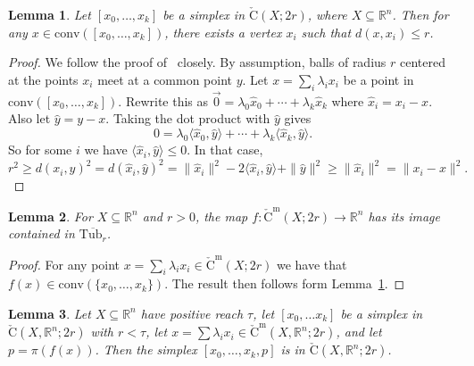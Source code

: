 \documentclass{amsart}
\theoremstyle{plain}
\newtheorem{lemma}{Lemma}[section]
\theoremstyle{definition}
\theoremstyle{myremark}
\newcommand{\R}{\mathbb{R}}
\newcommand{\conv}{\mathrm{conv}}
\newcommand{\cech}[2]{\mathrm{\check{C}}(#1;#2)}
\newcommand{\cecha}[3]{\mathrm{\check{C}}(#1,#2;#3)}
\newcommand{\cechm}[2]{\mathrm{\check{C}^m}(#1;#2)}
\newcommand{\cecham}[3]{\mathrm{\check{C}^m}(#1,#2;#3)}
\newcommand{\Tub}{\mathrm{Tub}}
\begin{document}
\begin{lemma}\label{lem:cech-radius}
Let $[x_0 , \ldots , x_k]$ be a simplex in $\cech{X}{2r}$, where $X\subseteq\R^n$.
Then for any $x \in \conv([x_0 , \ldots , x_k])$, there exists a vertex $x_i$ such that $d(x,x_i) \le r$.
\end{lemma}
\begin{proof}
We follow the proof of~\cite[Lemma~2.9]{DeSilvaGhrist} closely.
By assumption, balls of radius $r$ centered at the points $x_i$ meet at a common point $y$.
Let $x = \sum_i \lambda_i x_i$ be a point in $\conv([x_0 , \ldots , x_k])$.
Rewrite this as $\vec{0} = \lambda_0 \hat{x}_0 + \cdots + \lambda_k \hat{x}_k$ where $\hat{x}_i = x_i - x$.
Also let $\hat{y} = y - x$.
Taking the dot product with $\hat{y}$ gives
\[
   0 = \lambda_0\langle\hat{x}_0,\hat{y}\rangle + \cdots + \lambda_k\langle\hat{x}_k,\hat{y}\rangle.
\]
So for some $i$ we have $\langle\hat{x}_i,\hat{y}\rangle \le 0$.
In that case,
\[
r^2 \ge d(x_i,y)^2 = d(\hat{x}_i,\hat{y})^2 = \|\hat{x}_i\|^2 - 2\langle\hat{x}_i,\hat{y}\rangle + \|\hat{y}\|^2 \ge \|\hat{x}_i\|^2 = \|x_i - x\|^2.
\]
\end{proof}

\begin{lemma}\label{lem:cech-tub}
For $X\subseteq\R^n$ and $r>0$, the map $f\colon \cechm{X}{2r}\to\R^n$ has its image contained in $\overline{\Tub_r}$.
\end{lemma}

\begin{proof}
For any point $x=\sum_i\lambda_i x_i\in \cechm{X}{2r}$ we have that $f(x) \in \conv(\{x_0 , \ldots , x_k\})$.
The result then follows form Lemma~\ref{lem:cech-radius}.
\end{proof}

\begin{lemma}\label{lem:cech-simplex-ambient}
Let $X\subseteq\R^n$ have positive reach $\tau$, let $[x_0, \ldots x_k]$ be a simplex in $\cecha{X}{\R^n}{2r}$ with $r < \tau$, let $x = \sum \lambda_i x_i\in\cecham{X}{\R^n}{2r}$, and let $p=\pi(f(x))$.
Then the simplex $[x_0 , \ldots , x_k , p]$ is in $\cecha{X}{\R^n}{2r}$.
\end{lemma}
\end{document}

